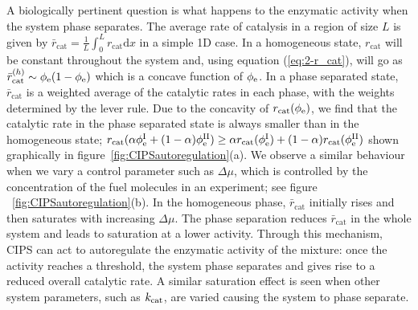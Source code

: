 A biologically pertinent question is what happens to the enzymatic activity when the system phase separates. The average rate of catalysis in a region of size $L$ is given by $\bar{r}_\mathrm{cat} = \frac{1}{L}\int_0^L r_\mathrm{cat} \mathrm{d}x$ in a simple 1D case. In a homogeneous state, $r_\mathrm{cat}$ will be constant throughout the system and, using equation (\ref{eq:2-r_cat}), will go as $\bar{r}_\mathrm{cat}^{\mathrm(h)}\sim\phi_{\mathrm{e}}(1-\phi_{\mathrm{e}})$ which is a concave function of $\phi_{\mathrm{e}}$. In a phase separated state, $\bar{r}_\mathrm{cat}$ is a weighted average of the catalytic rates in each phase, with the weights determined by the lever rule. Due to the concavity of $r_{\mathrm{cat}}(\phi_{\mathrm{e}})$, we find that the catalytic rate in the phase separated state is always smaller than in the homogeneous state; $r_{\mathrm{cat}}(\alpha\phi_{\mathrm{e}}^{\mathrm{I}}+(1-\alpha)\phi_{\mathrm{e}}^{\mathrm{II}}) \geq \alpha r_{\mathrm{cat}}(\phi_{\mathrm{e}}^{\mathrm{I}})+(1-\alpha)r_{\mathrm{cat}}(\phi_{\mathrm{e}}^{\mathrm{II}})$ shown graphically in figure~\ref{fig:CIPSautoregulation}(a). We observe a similar behaviour when we vary a control parameter such as $\Delta\mu$, which is controlled by the concentration of the fuel molecules in an experiment; see figure ~\ref{fig:CIPSautoregulation}(b). In the homogeneous phase, $\bar{r}_\mathrm{cat}$ initially rises and then saturates with increasing $\Delta\mu$. The phase separation reduces $\bar{r}_\mathrm{cat}$ in the whole system and leads to saturation at a lower activity. Through this mechanism, CIPS can act to autoregulate the enzymatic activity of the mixture: once the activity reaches a threshold, the system phase separates and gives rise to a reduced overall catalytic rate. A similar saturation effect is seen when other system parameters, such as $k_{\mathrm{cat}}$, are varied causing the system to phase separate.


